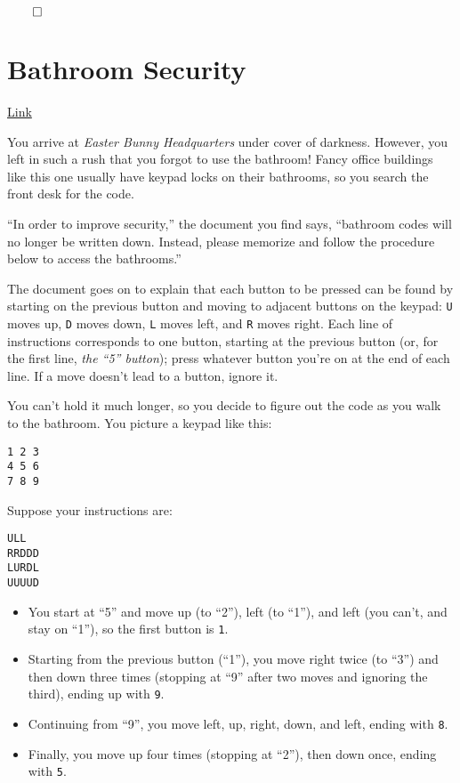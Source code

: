 \documentclass[b5paper,twoside]{amsbook}
\providecommand{\tightlist}{%
  \setlength{\itemsep}{0pt}\setlength{\parskip}{0pt}}
\begin{document}
\(\qed\)

\newpage

\chapter{Bathroom Security}\label{bathroom-security}

\href{https://adventofcode.com/2016/day/2}{Link}

You arrive at \emph{Easter Bunny Headquarters} under cover of darkness.
However, you left in such a rush that you forgot to use the bathroom!
Fancy office buildings like this one usually have keypad locks on their
bathrooms, so you search the front desk for the code.

``In order to improve security,'' the document you find says, ``bathroom
codes will no longer be written down. Instead, please memorize and
follow the procedure below to access the bathrooms.''

The document goes on to explain that each button to be pressed can be
found by starting on the previous button and moving to adjacent buttons
on the keypad: \texttt{U} moves up, \texttt{D}
moves down, \texttt{L} moves left, and
\texttt{R} moves right. Each line of instructions
corresponds to one button, starting at the previous button (or, for the
first line, \emph{the ``5'' button}); press whatever button you're on at
the end of each line. If a move doesn't lead to a button, ignore it.

You can't hold it much longer, so you decide to figure out the code as
you walk to the bathroom. You picture a keypad like this:

\begin{verbatim}
1 2 3
4 5 6
7 8 9
\end{verbatim}

Suppose your instructions are:

\begin{verbatim}
ULL
RRDDD
LURDL
UUUUD
\end{verbatim}

\begin{itemize}
\tightlist
\item
  You start at ``5'' and move up (to ``2''), left (to ``1''), and left
  (you can't, and stay on ``1''), so the first button is
  \texttt{1}.
\item
  Starting from the previous button (``1''), you move right twice (to
  ``3'') and then down three times (stopping at ``9'' after two moves
  and ignoring the third), ending up with \texttt{9}.
\item
  Continuing from ``9'', you move left, up, right, down, and left,
  ending with \texttt{8}.
\item
  Finally, you move up four times (stopping at ``2''), then down once,
  ending with \texttt{5}.
\end{itemize}
\end{document}
